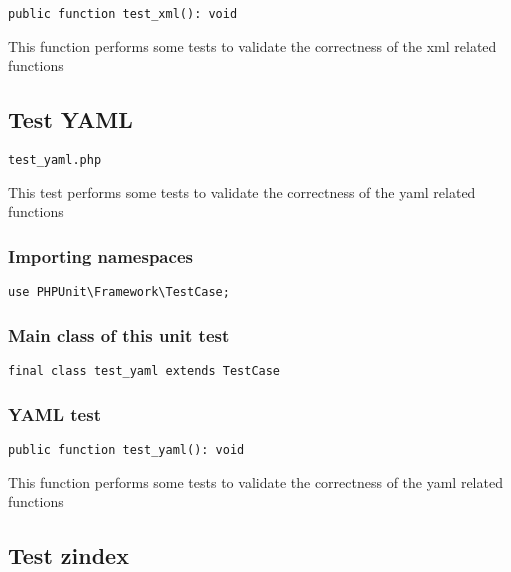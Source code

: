\documentclass[a4paper]{article}
\begin{document}
\begin{lstlisting}
public function test_xml(): void
\end{lstlisting}

This function performs some tests to validate the correctness
of the xml related functions

\hypertarget{toc429}{}
\subsection{Test YAML}

\begin{lstlisting}
test_yaml.php
\end{lstlisting}

This test performs some tests to validate the correctness
of the yaml related functions

\hypertarget{toc430}{}
\subsubsection{Importing namespaces}

\begin{lstlisting}
use PHPUnit\Framework\TestCase;
\end{lstlisting}

\hypertarget{toc431}{}
\subsubsection{Main class of this unit test}

\begin{lstlisting}
final class test_yaml extends TestCase
\end{lstlisting}

\hypertarget{toc432}{}
\subsubsection{YAML test}

\begin{lstlisting}
public function test_yaml(): void
\end{lstlisting}

This function performs some tests to validate the correctness
of the yaml related functions

\hypertarget{toc433}{}
\subsection{Test zindex}
\end{document}
